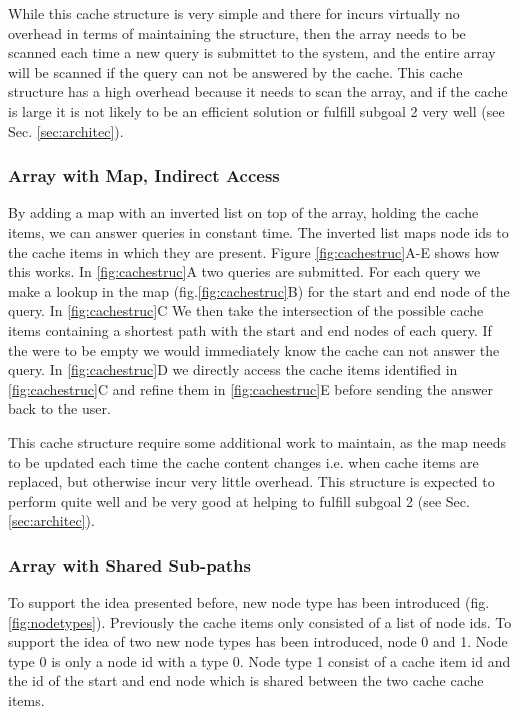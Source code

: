 While this cache structure is very simple and there for incurs virtually no overhead in terms of maintaining the structure, then the array needs to be scanned each time a new query is submittet to the system, and the entire array will be scanned if the query can not be answered by the cache. This cache structure has a high overhead because it needs to scan the array, and if the cache is large it is not likely to be an efficient solution or fulfill subgoal 2 very well (see Sec. \ref{sec:architec}).


\subsubsection{Array with Map, Indirect Access}
By adding a map with an inverted list on top of the array, holding the cache items, we can answer queries in constant time. The inverted list maps node ids to the cache items in which they are present. Figure \ref{fig:cachestruc}A-E shows how this works. In \ref{fig:cachestruc}A two queries are submitted. For each query we make a lookup in the map (fig.\ref{fig:cachestruc}B) for the start and end node of the query. In \ref{fig:cachestruc}C We then take the intersection of the possible cache items containing a shortest path with the start and end nodes of each query. If the were to be empty we would immediately know the cache can not answer the query. In \ref{fig:cachestruc}D we directly access the cache items identified in \ref{fig:cachestruc}C and refine them in \ref{fig:cachestruc}E before sending the answer back to the user.

This cache structure require some additional work to maintain, as the map needs to be updated each time the cache content changes i.e. when cache items are replaced, but otherwise incur very little overhead. This structure is expected to perform quite well and be very good at helping to fulfill subgoal 2 (see Sec. \ref{sec:architec}).

\subsubsection{Array with Shared Sub-paths}
To support the \sps idea presented before, new node type has been introduced (fig. \ref{fig:nodetypes}). Previously the cache items only consisted of a list of node ids. To support the idea of \sps two new node types has been introduced, node 0 and 1. Node type 0 is only a node id with a type 0. Node type 1 consist of a cache item id and the id of the start and end node which is shared between the two cache cache items.

